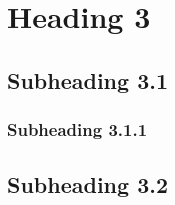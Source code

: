 \section{Heading 3}
    
    \subsection{Subheading 3.1}
        
        \subsubsection{Subheading 3.1.1}
        
    \subsection{Subheading 3.2}
